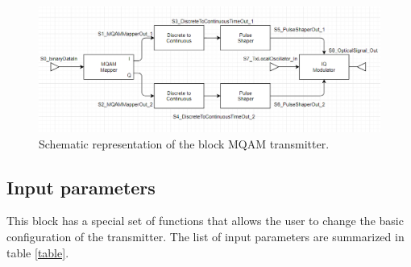 \begin{figure}[H]
	\centering
	\includegraphics[width=\textwidth]{./lib/m_qam_transmitter/figure_PLoureiro/MQAM_Transmitter}
	\caption{Schematic representation of the block MQAM transmitter.}\label{MQAM_transmitter_block_diagram}
\end{figure}

\subsection*{Input parameters}

This block has a special set of functions that allows the user to change the basic configuration of the transmitter. The list of input parameters are summarized in table \ref{table}.

